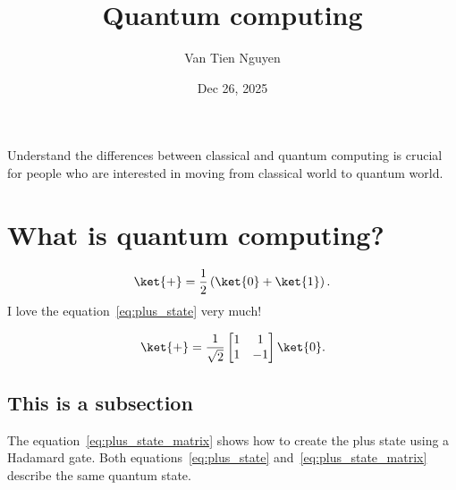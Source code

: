 \title{Quantum computing}
\author{Van Tien Nguyen}
\date{Dec 26, 2025}


\maketitle

Understand the differences between classical and quantum computing is crucial for people who are interested in moving from classical world to quantum world.
\section{What is quantum computing?}
\begin{equation}
  \ket{+} = \frac{1}{2}\left(\ket{0}+\ket{1}\right).
  \label{eq:plus_state}
\end{equation}
I love the equation~\eqref{eq:plus_state} very much!

\begin{equation}
\ket{+} = \frac{1}{\sqrt{2}}\begin{bmatrix}
    1 & 1 \\
    1 & -1
\end{bmatrix}\ket{0}.
\label{eq:plus_state_matrix}
\end{equation}

\subsection{This is a subsection}

The equation~\eqref{eq:plus_state_matrix} shows how to create the plus state using a Hadamard gate. Both equations~\eqref{eq:plus_state} and~\eqref{eq:plus_state_matrix} describe the same quantum state.

